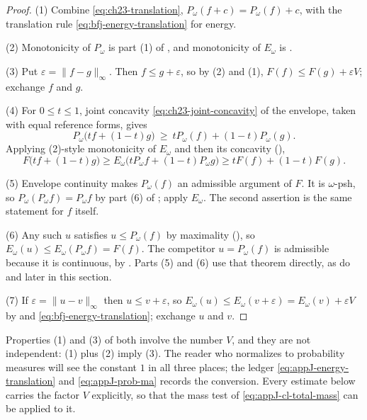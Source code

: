 \begin{proof}
(1) Combine \eqref{eq:ch23-translation}, $P_\omega(f+c)=P_\omega(f)+c$,
with the translation rule \eqref{eq:bfj-energy-translation} for energy.

(2) Monotonicity of $P_\omega$ is part (1) of
, and monotonicity of $E_\omega$
is .

(3) Put $\varepsilon=\lVert f-g\rVert_\infty$.  Then $f\leq g+\varepsilon$,
so by (2) and (1), $F(f)\leq F(g)+\varepsilon V$; exchange $f$ and
$g$.

(4) For $0\leq t\leq1$, joint concavity \eqref{eq:ch23-joint-concavity} of
the envelope, taken with equal reference forms, gives
\[
 P_\omega\bigl(tf+(1-t)g\bigr)\ \geq\ tP_\omega(f)+(1-t)P_\omega(g).
\]
Applying (2)-style monotonicity of $E_\omega$ and then its concavity
(),
\[
 F\bigl(tf+(1-t)g\bigr)
 \geq E_\omega\bigl(tP_\omega f+(1-t)P_\omega g\bigr)
 \geq tF(f)+(1-t)F(g).
\]

(5) Envelope continuity makes $P_\omega(f)$ an admissible argument of
$F$.  It is $\omega$-psh, so
$P_\omega(P_\omega f)=P_\omega f$ by part (6) of
; apply $E_\omega$.  The second
assertion is the same statement for $f$ itself.

(6) Any such $u$ satisfies $u\leq P_\omega(f)$ by maximality
(), so
$E_\omega(u)\leq E_\omega(P_\omega f)=F(f)$.  The competitor
$u=P_\omega(f)$ is admissible because it is continuous, by
.  Parts (5) and (6) use that theorem
directly, as do  and
 later in this section.

(7) If $\varepsilon=\lVert u-v\rVert_\infty$ then $u\leq v+\varepsilon$,
so $E_\omega(u)\leq E_\omega(v+\varepsilon)=E_\omega(v)+\varepsilon V$ by
 and
\eqref{eq:bfj-energy-translation}; exchange $u$ and $v$.
\end{proof}

\begin{remark}
\label{rem:ch27-three-constants}
Properties (1) and (3) of  both involve the
number $V$, and they are not independent: (1) plus (2) imply (3).  The
reader who normalizes to probability measures will see the constant $1$ in
all three places; the ledger \eqref{eq:appJ-energy-translation} and
\eqref{eq:appJ-prob-ma} records the conversion.  Every estimate below
carries the factor $V$ explicitly, so that the mass test of
\eqref{eq:appJ-cl-total-mass} can be applied to it.
\end{remark}

